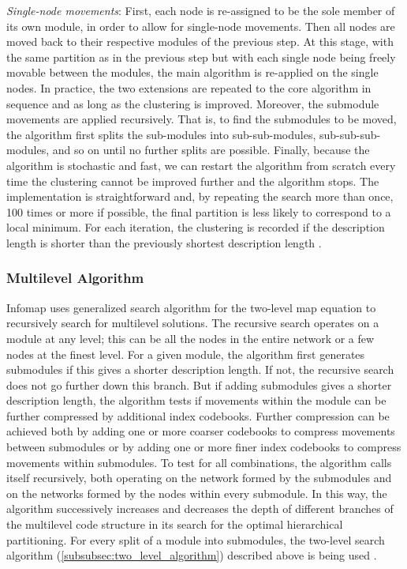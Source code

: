 {\textit{Single-node movements}: First, each node is re-assigned to be the sole member of its own module, in order to allow for single-node movements. Then all nodes are moved back to their respective modules of the previous step. At this stage, with the same partition as in the previous step but with each single node being freely movable between the modules, the main algorithm is re-applied on the single nodes.
In practice, the two extensions are repeated to the core algorithm in sequence and as long as the clustering is improved. Moreover, the submodule movements are applied recursively. That is, to find the submodules to be moved, the algorithm first splits the sub-modules into sub-sub-modules, sub-sub-sub-modules, and so on until no further splits are possible. Finally, because the algorithm is stochastic and fast, we can restart the algorithm from scratch every time the clustering cannot be improved further and the algorithm stops. The implementation is straightforward and, by repeating the search more than once, 100 times or more if possible, the final partition is less likely to correspond to a local minimum. For each iteration, the clustering is recorded if the description length is shorter than the previously shortest description length \cite{ref-47}.

\subsubsection*{Multilevel Algorithm}\label{subsubsec:multilevel_algorithm}
Infomap uses generalized search algorithm for the two-level map equation to recursively search for multilevel solutions. The recursive search operates on a module at any level; this can be all the nodes in the entire network or a few nodes at the finest level. For a given module, the algorithm first generates submodules if this gives a shorter description length. If not, the recursive search does not go further down this branch. But if adding submodules gives a shorter description length, the algorithm tests if movements within the module can be further compressed by additional index codebooks. Further compression can be achieved both by adding one or more coarser codebooks to compress movements between submodules or by adding one or more finer index codebooks to compress movements within submodules. To test for all combinations, the algorithm calls itself recursively, both operating on the network formed by the submodules and on the networks formed by the nodes within every submodule. In this way, the algorithm successively increases and decreases the depth of different branches of the multilevel code structure in its search for the optimal hierarchical partitioning. For every split of a module into submodules, the two-level search algorithm (\ref{subsubsec:two_level_algorithm}) described above is being used \cite{ref-47}.

}
